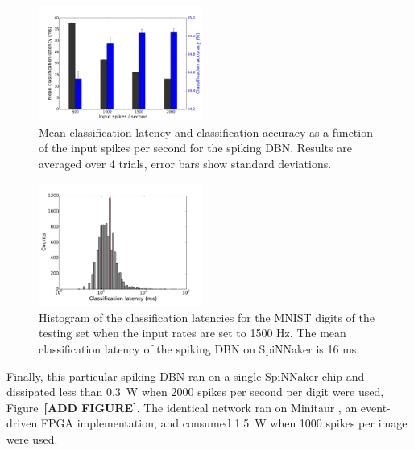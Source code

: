 \begin{figure}[hbt!]
	\centering
	\includegraphics[width=0.48\textwidth]{images/evan/latencyCAfiringrate.pdf}
	\caption{Mean classification latency and classification accuracy as a function of the input spikes per second for the spiking DBN. Results are averaged over 4 trials, error bars show standard deviations.}
	\label{Fig:brianLatency}
\end{figure} 



\begin{figure}[hbt!]
	\centering
	\includegraphics[width=0.48\textwidth]{images/evan/classlatencyIJCNN1500hz.pdf}
	\caption{Histogram of the classification latencies for the MNIST digits of the testing set when the input rates are set to 1500 Hz. The mean classification latency of the spiking DBN on SpiNNaker is 16 ms.}
	\label{Fig:spinnLatency1500hz}
\end{figure} 


Finally, this particular spiking DBN ran on a single SpiNNaker chip and dissipated less than 0.3~W when 2000 spikes per second per digit were used, Figure~\textbf{[ADD FIGURE]}. The identical network ran on Minitaur \citep{}, an event-driven FPGA implementation, and consumed 1.5~W when 1000 spikes per image were used.  


%
%
%
%
%
%
